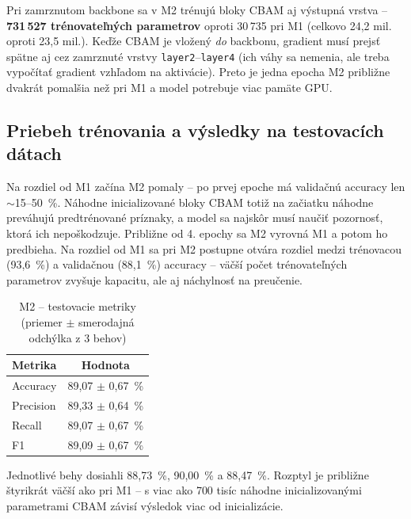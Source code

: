Pri zamrznutom backbone sa v M2 trénujú bloky CBAM aj výstupná vrstva --
\textbf{731\,527 trénovateľných parametrov} oproti 30\,735 pri M1 (celkovo
24,2 mil. oproti 23,5 mil.). Keďže CBAM je vložený \emph{do} backbonu, gradient
musí prejsť spätne aj cez zamrznuté vrstvy \texttt{layer2}--\texttt{layer4}
(ich váhy sa nemenia, ale treba vypočítať gradient vzhľadom na aktivácie).
Preto je jedna epocha M2 približne dvakrát pomalšia než pri M1 a model
potrebuje viac pamäte GPU.

\subsection{Priebeh trénovania a výsledky na testovacích dátach}


Na rozdiel od M1 začína M2 pomaly -- po prvej epoche má validačnú accuracy
len $\sim$15--50~\%. Náhodne inicializované bloky CBAM totiž na začiatku
náhodne preváhujú predtrénované príznaky, a model sa najskôr musí naučiť
pozornosť, ktorá ich nepoškodzuje. Približne od 4. epochy sa M2 vyrovná M1
a potom ho predbieha. Na rozdiel od M1 sa pri M2 postupne otvára rozdiel
medzi trénovacou (93,6~\%) a validačnou (88,1~\%) accuracy -- väčší počet
trénovateľných parametrov zvyšuje kapacitu, ale aj náchylnosť na preučenie.

\begin{table}[H]
    \centering
    \caption{M2 -- testovacie metriky (priemer $\pm$ smerodajná odchýlka z 3 behov)}
    \label{tab:m2-metrics}
    \begin{tabular}{lc}
        \toprule
        Metrika & Hodnota \\
        \midrule
        Accuracy  & 89,07 $\pm$ 0,67~\% \\
        Precision & 89,33 $\pm$ 0,64~\% \\
        Recall    & 89,07 $\pm$ 0,67~\% \\
        F1        & 89,09 $\pm$ 0,67~\% \\
        \bottomrule
    \end{tabular}
\end{table}

Jednotlivé behy dosiahli 88,73~\%, 90,00~\% a 88,47~\%. Rozptyl je približne
štyrikrát väčší ako pri M1 -- s viac ako 700 tisíc náhodne
inicializovanými parametrami CBAM závisí výsledok viac od inicializácie.

